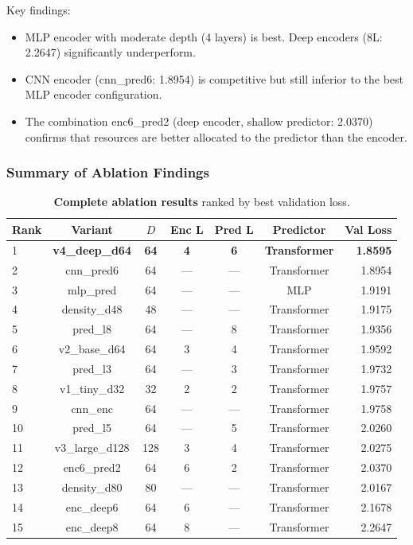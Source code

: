\documentclass[11pt]{article}
\begin{document}
\noindent Key findings:
\begin{itemize}[nosep]
  \item MLP encoder with moderate depth (4 layers) is best. Deep encoders (8L: 2.2647) significantly underperform.
  \item CNN encoder (cnn\_pred6: 1.8954) is competitive but still inferior to the best MLP encoder configuration.
  \item The combination enc6\_pred2 (deep encoder, shallow predictor: 2.0370) confirms that resources are better allocated to the predictor than the encoder.
\end{itemize}

\subsubsection{Summary of Ablation Findings}

\begin{table}[t]
\centering
\caption{\textbf{Complete ablation results} ranked by best validation loss.}
\label{tab:ablation}
\small
\begin{tabular}{lcccccr}
\toprule
Rank & Variant & $D$ & Enc L & Pred L & Predictor & Val Loss \\
\midrule
1 & \textbf{v4\_deep\_d64} & \textbf{64} & \textbf{4} & \textbf{6} & \textbf{Transformer} & \textbf{1.8595} \\
2 & cnn\_pred6  & 64 & --- & --- & Transformer & 1.8954 \\
3 & mlp\_pred   & 64 & --- & --- & MLP         & 1.9191 \\
4 & density\_d48 & 48 & --- & --- & Transformer & 1.9175 \\
5 & pred\_l8    & 64 & --- & 8   & Transformer & 1.9356 \\
6 & v2\_base\_d64 & 64 & 3   & 4   & Transformer & 1.9592 \\
7 & pred\_l3    & 64 & --- & 3   & Transformer & 1.9732 \\
8 & v1\_tiny\_d32 & 32 & 2   & 2   & Transformer & 1.9757 \\
9 & cnn\_enc    & 64 & --- & --- & Transformer & 1.9758 \\
10 & pred\_l5   & 64 & --- & 5   & Transformer & 2.0260 \\
11 & v3\_large\_d128 & 128 & 3 & 4   & Transformer & 2.0275 \\
12 & enc6\_pred2 & 64 & 6   & 2   & Transformer & 2.0370 \\
13 & density\_d80 & 80 & --- & --- & Transformer & 2.0167 \\
14 & enc\_deep6  & 64 & 6   & --- & Transformer & 2.1678 \\
15 & enc\_deep8  & 64 & 8   & --- & Transformer & 2.2647 \\
\bottomrule
\end{tabular}
\end{table}
\end{document}
